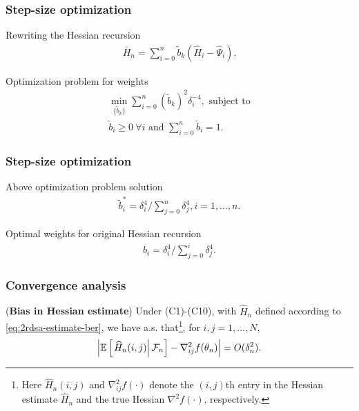 \begin{frame}
\begin{small}
\frametitle{\centering Step-size optimization}
\begin{block}{Rewriting the Hessian recursion}
\begin{align}
\label{eq:hess}
\overline H_n = \sum\limits_{i=0}^{n} \tilde b_k(\widehat H_i -\widehat \Psi_i).
\end{align}
\end{block}
\pause
\begin{block}{Optimization problem for weights}
\begin{align}
\min_{ \{\tilde b_k\} } \sum \limits_{i=0}^{n} (\tilde b_k)^2 \delta_i^{-4}, \text{ subject to} \label{eq:wn-opt}\\
\tilde b_i \geq 0 ~\forall i \text{ and }\sum \limits_{i=0}^{n} \tilde b_i = 1.
\end{align}
\end{block}
\end{small}
\end{frame}

\begin{frame}
\begin{small}
\frametitle{\centering Step-size optimization}
\begin{block}{Above optimization problem solution}
\begin{align}
\tilde b_i^* = \delta_i^{4}/\sum \limits_{j=0}^{n} \delta_j^{4}, i=1,\ldots,n.
\end{align}
\end{block}
\pause
\begin{block}{Optimal weights for original Hessian recursion}
\begin{align}
\label{eq:wieghts}
b_i  = \delta_i^{4}/\sum\limits_{j=0}^{i} \delta_j^{4}.
\end{align}
\end{block}
\end{small}
\end{frame}

\begin{frame}
\begin{small}
\frametitle{\centering Convergence analysis}

\begin{lemma}(\textbf{Bias in Hessian estimate})
\label{lemma:2rdsa-bias}
Under (C1)-(C10), with $\widehat H_n$ defined according to \eqref{eq:2rdsa-estimate-ber}, we have a.s. that\footnote{Here $\widehat H_n(i,j)$ and $\nabla^2_{ij}f(\cdot)$ denote the $(i,j)$th entry in the Hessian estimate $\widehat H_n$ and the true Hessian $\nabla^2 f(\cdot)$, respectively.}, for $i,j = 1,\ldots,N$,
\begin{align}
\left|\mathbb{E}\left[
\left. \widehat H_n(i,j) \right| \mathcal{F}_n \right] - \nabla^2_{ij} f(\theta_n)\right| = O(\delta_n^2).
\end{align} 
\end{lemma}
\end{small}
\end{frame}


